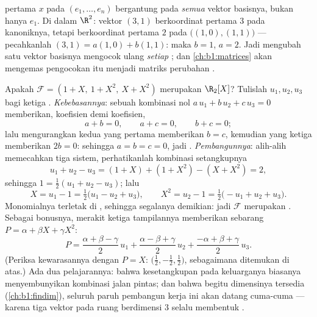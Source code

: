 \begin{remark}
\label{rem:b1:vspaces:teameffort}
 pertama $x$ pada  $(e_1, \dots, e_n)$
bergantung pada \emph{semua} vektor basisnya, bukan hanya $e_1$. Di dalam
$\R^2$: vektor $(3, 1)$ berkoordinat pertama $3$ pada
 kanoniknya, tetapi berkoordinat pertama $2$ pada 
$\bigl((1,0), (1,1)\bigr)$ --- pecahkanlah $(3,1) = a(1,0) + b(1,1)$:
maka $b = 1$, $a = 2$. Jadi mengubah satu vektor basisnya mengocok ulang
\emph{setiap} ; dan \cref{ch:b1:matrices} akan mengemas
pengocokan itu menjadi matriks perubahan .
\end{remark}

\begin{example}
\label{ex:b1:vspaces:testbasis}
Apakah $\mathcal{F} = (1 + X,\ 1 + X^2,\ X + X^2)$ merupakan 
$\R_2[X]$? Tulislah $u_1, u_2, u_3$ bagi ketiga .
\emph{Kebebasannya}: sebuah kombinasi nol $a\,u_1 + b\,u_2 + c\,u_3 =
0$ memberikan, koefisien demi koefisien,
\[
a + b = 0, \qquad a + c = 0, \qquad b + c = 0 ;
\]
lalu mengurangkan kedua yang pertama memberikan $b = c$, kemudian yang ketiga memberikan $2b =
0$: sehingga $a = b = c = 0$, jadi . \emph{Pembangunnya}: alih-alih memecahkan
tiga sistem, perhatikanlah kombinasi setangkupnya
\[
u_1 + u_2 - u_3 = (1 + X) + (1 + X^2) - (X + X^2) = 2 ,
\]
sehingga $1 = \frac12(u_1 + u_2 - u_3)$; lalu
\[
X = u_1 - 1 = \tfrac12\bigl(u_1 - u_2 + u_3\bigr),
\qquad
X^2 = u_2 - 1 = \tfrac12\bigl(-u_1 + u_2 + u_3\bigr).
\]
Monomialnya terletak di , sehingga segalanya demikian: jadi $\mathcal{F}$
merupakan . Sebagai bonusnya, merakit ketiga tampilannya memberikan
 sebarang $P = \alpha + \beta X + \gamma X^2$:
\[
P = \frac{\alpha + \beta - \gamma}{2}\,u_1
+ \frac{\alpha - \beta + \gamma}{2}\,u_2
+ \frac{-\alpha + \beta + \gamma}{2}\,u_3 .
\]
(Periksa kewarasannya dengan $P = X$:  $\bigl(\frac12,
-\frac12, \frac12\bigr)$, sebagaimana ditemukan di atas.) Ada dua pelajarannya: bahwa kesetangkupan
pada keluarganya biasanya menyembunyikan kombinasi jalan pintas; dan bahwa begitu
dimensinya tersedia (\cref{ch:b1:findim}), seluruh paruh
pembangun kerja ini akan datang cuma-cuma --- karena tiga
vektor  pada ruang berdimensi $3$ selalu membentuk .
\end{example}

